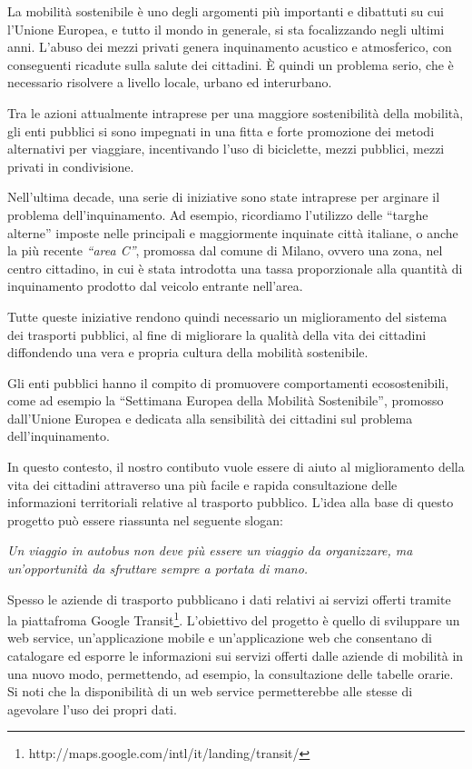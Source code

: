 La mobilit\`{a} sostenibile \`{e} uno degli argomenti pi\`{u} importanti e dibattuti su cui l\rq Unione Europea, e tutto il mondo in generale, si sta focalizzando negli ultimi anni. L\rq abuso dei mezzi privati genera inquinamento acustico e atmosferico, con conseguenti ricadute sulla salute dei cittadini. \`{E} quindi un problema serio, che \`{e} necessario risolvere a livello locale, urbano ed interurbano. 

Tra le azioni attualmente intraprese per una maggiore sostenibilit\`{a} della mobilit\`{a}, gli enti pubblici si sono impegnati in una fitta e forte promozione dei metodi alternativi per viaggiare, incentivando l\rq uso di biciclette, mezzi pubblici, mezzi privati in condivisione. 

Nell\rq ultima decade, una serie di iniziative sono state intraprese per arginare il problema dell\rq inquinamento. Ad esempio, ricordiamo l\rq utilizzo delle ``targhe alterne'' imposte nelle principali e maggiormente inquinate citt\`{a} italiane, o anche la pi\`{u} recente \emph{``area C''}, promossa dal comune di Milano, ovvero una zona, nel centro cittadino, in cui \`{e} stata introdotta una tassa proporzionale alla quantit\`{a} di inquinamento prodotto dal veicolo entrante nell\rq area.

Tutte queste iniziative rendono quindi necessario un miglioramento del sistema dei trasporti pubblici, al fine di migliorare la qualit\`{a} della vita dei cittadini diffondendo una vera e propria cultura della mobilit\`{a} sostenibile.

Gli enti pubblici hanno il compito di promuovere comportamenti ecosostenibili, come ad esempio la ``Settimana Europea della Mobilit\`{a} Sostenibile'', promosso dall\rq Unione Europea e dedicata alla sensibilit\`{a} dei cittadini sul problema dell\rq inquinamento.

In questo contesto, il nostro contibuto vuole essere di aiuto al miglioramento della vita dei cittadini attraverso una pi\`{u} facile e rapida consultazione delle informazioni territoriali relative al trasporto pubblico. L\rq idea alla base di questo progetto pu\`{o} essere riassunta nel seguente slogan:

\begin{center}
\emph{Un viaggio in autobus non deve pi\`{u} essere un viaggio da organizzare, ma un\rq opportunit\`{a} da sfruttare sempre a portata di mano.}
\end{center}

Spesso le aziende di trasporto pubblicano i dati relativi ai servizi offerti tramite la piattafroma Google Transit\footnote{http://maps.google.com/intl/it/landing/transit/}. L\rq obiettivo del progetto \`{e} quello di sviluppare un web service, un\rq applicazione mobile e un\rq applicazione web che consentano di catalogare ed esporre le informazioni sui servizi offerti dalle aziende di mobilità in una nuovo modo, permettendo, ad esempio, la consultazione delle tabelle orarie. Si noti che la disponibilit\`{a} di un web service permetterebbe alle stesse di agevolare l\rq uso dei propri dati.


